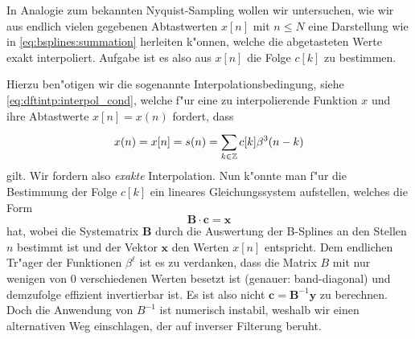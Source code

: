In Analogie zum bekannten Nyquist-Sampling wollen wir untersuchen, wie wir aus endlich vielen gegebenen Abtastwerten $x[n]$ mit $n \leqslant N$ eine Darstellung wie in \eqref{eq:bsplines:summation} herleiten k"onnen, welche die abgetasteten Werte exakt interpoliert. Aufgabe ist es also aus $x[n]$ die Folge $c[k]$ zu bestimmen.

Hierzu ben"otigen wir die sogenannte Interpolationsbedingung, siehe \eqref{eq:dftintp:interpol_cond}, welche f"ur eine zu interpolierende Funktion $x$ und ihre Abtastwerte $x[n] = x(n)$ fordert, dass
\begin{equation}\label{eq:bsplines:interpol_cond}
    x(n) = x[n] = s(n) = {\sum\limits_{k \in \mathbb{Z}}^{}{
        c[k] \beta^{3}(n - k)
    }}
\end{equation}
gilt. 
Wir fordern also \emph{exakte} Interpolation. 
Nun k"onnte man f"ur die Bestimmung der Folge $c[k]$ ein lineares Gleichungssystem aufstellen, welches die Form
%
\begin{equation}\label{eq:bsplines:lse}
    \bm B \cdot \bm c = \bm x
\end{equation}
%
hat, wobei die Systematrix $\bm B$ durch die Auswertung der B-Splines an den Stellen $n$ bestimmt ist und der Vektor $\bm x$ den Werten $x[n]$ entspricht. 
Dem endlichen Tr"ager der Funktionen $\beta^\ell$ ist es zu verdanken, dass die Matrix $B$ mit nur wenigen von $0$ verschiedenen Werten besetzt ist (genauer: band-diagonal) und demzufolge effizient invertierbar ist.
Es ist also nicht  $\bm c = \bm B^{-1} \bm y$ zu berechnen. 
Doch die Anwendung von $B^{-1}$ ist numerisch instabil, weshalb wir einen alternativen Weg einschlagen, der auf inverser Filterung beruht.


